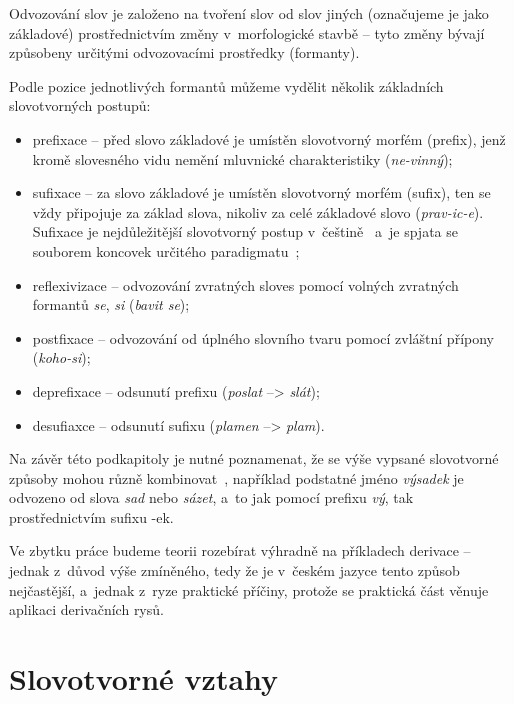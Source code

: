 Odvozování slov je založeno na tvoření slov od slov jiných (označujeme
je jako základové) prostřednictvím změny v~morfologické stavbě -- tyto
změny bývají způsobeny určitými odvozovacími prostředky (formanty).
\parencite[93]{dokulil00}

Podle pozice jednotlivých formantů můžeme vydělit několik základních
slovotvorných postupů:

\begin{itemize}
\tightlist
\item
  prefixace -- před slovo základové je umístěn slovotvorný morfém
  (prefix), jenž kromě slovesného vidu nemění mluvnické charakteristiky
  (\emph{ne-vinný});
\item
  sufixace -- za slovo základové je umístěn slovotvorný morfém (sufix),
  ten se vždy připojuje za základ slova, nikoliv za celé základové slovo
  (\emph{prav-ic-e}). Sufixace je nejdůležitější slovotvorný postup
v~češtině~\parencite[23]{dokulil62} a~je spjata se souborem koncovek
  určitého paradigmatu~\parencite[93]{dokulil00};
\item
  reflexivizace -- odvozování zvratných sloves pomocí volných zvratných
  formantů \emph{se}, \emph{si} (\emph{bavit se});
\item
  postfixace -- odvozování od úplného slovního tvaru pomocí zvláštní
  přípony (\emph{koho-si});
\item
  deprefixace -- odsunutí prefixu (\emph{poslat} --\textgreater{}
  \emph{slát});
\item
  desufiaxce -- odsunutí sufixu (\emph{plamen} --\textgreater{}
  \emph{plam}).~\parencite[93--94]{dokulil00}
\end{itemize}

Na závěr této podkapitoly je nutné poznamenat, že se výše vypsané
slovotvorné způsoby mohou různě kombinovat~\parencite[93]{dokulil00},
například podstatné jméno \emph{výsadek} je odvozeno od slova \emph{sad}
nebo \emph{sázet}, a~to jak pomocí prefixu \emph{vý}, tak
prostřednictvím sufixu -ek.

Ve zbytku práce budeme teorii rozebírat výhradně na příkladech derivace
-- jednak z~důvod výše zmíněného, tedy že je v~českém jazyce tento
způsob nejčastější, a~jednak z~ryze praktické příčiny, protože se
praktická část věnuje aplikaci derivačních rysů.

\hypertarget{slovotvornuxe9-vztahy}{%
\section{Slovotvorné vztahy}\label{slovotvornuxe9-vztahy}}


